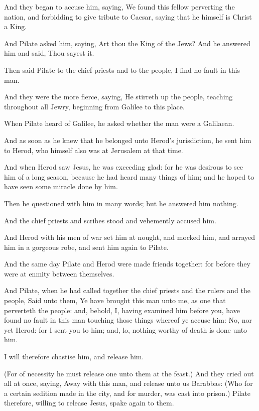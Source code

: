 \Verse And they began to accuse him, saying, We found this fellow perverting the nation, and forbidding to give tribute to Caesar, saying that he himself is Christ a King.

\Verse And Pilate asked him, saying, Art thou the King of the Jews? And he answered him and said, Thou sayest it.

\Verse Then said Pilate to the chief priests and to the people, I find no fault in this man.

\Verse And they were the more fierce, saying, He stirreth up the people, teaching throughout all Jewry, beginning from Galilee to this place.

\Verse When Pilate heard of Galilee, he asked whether the man were a Galilaean.

\Verse And as soon as he knew that he belonged unto Herod's jurisdiction, he sent him to Herod, who himself also was at Jerusalem at that time.

\Verse And when Herod saw Jesus, he was exceeding glad: for he was desirous to see him of a long season, because he had heard many things of him; and he hoped to have seen some miracle done by him.

\Verse Then he questioned with him in many words; but he answered him nothing.

\Verse And the chief priests and scribes stood and vehemently accused him.

\Verse And Herod with his men of war set him at nought, and mocked him, and arrayed him in a gorgeous robe, and sent him again to Pilate.

\Verse And the same day Pilate and Herod were made friends together: for before they were at enmity between themselves.

\Verse And Pilate, when he had called together the chief priests and the rulers and the people, \Verse Said unto them, Ye have brought this man unto me, as one that perverteth the people: and, behold, I, having examined him before you, have found no fault in this man touching those things whereof ye accuse him: \Verse No, nor yet Herod: for I sent you to him; and, lo, nothing worthy of death is done unto him.

\Verse I will therefore chastise him, and release him.

\Verse (For of necessity he must release one unto them at the feast.)  \Verse And they cried out all at once, saying, Away with this man, and release unto us Barabbas: \Verse (Who for a certain sedition made in the city, and for murder, was cast into prison.)  \Verse Pilate therefore, willing to release Jesus, spake again to them.


